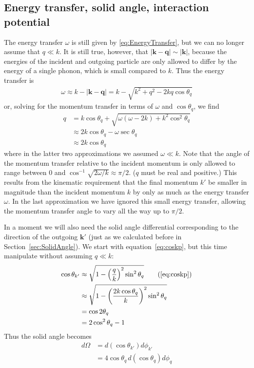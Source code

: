 \documentclass{article}
\begin{document}
\subsection{Energy transfer, solid angle, interaction potential}

The energy transfer $\omega$ is still given by \eqref{eq:EnergyTransfer}, but we can no longer assume that $q \ll k$. It is still true, however, that $|\textbf{k} - \textbf{q}| \sim |\textbf{k}|$, because the energies of the incident and outgoing particle are only allowed to differ by the energy of a single phonon, which is small compared to $k$. Thus the energy transfer is
\begin{align}
\omega \approx k - |\textbf{k} - \textbf{q}| = k - \sqrt{k^2 + q^2 - 2 kq \cos\theta_q}
\end{align}
or, solving for the momentum transfer in terms of $\omega$ and $\cos\theta_q$, we find
\begin{align}
q &= k \cos\theta_q + \sqrt{\omega(\omega - 2 k) + k^2 \cos^2 \theta_q} \label{eq:LargeMomentumTransfer}\\
  &\approx 2k \cos\theta_q - \omega \sec \theta_q \\
  &\approx 2k \cos\theta_q \label{eq:DistantBrilliounZone1PhononMomentumTransfer}
\end{align}
where in the latter two approximations we assumed $\omega\ll k$. Note that the angle of the momentum transfer relative to the incident momentum is only allowed to range between $0$ and $\cos^{-1}\sqrt{2 \omega / k} \approx \pi / 2$. ($q$ must be real and positive.) This results from the kinematic requirement that the final momentum $k'$ be smaller in magnitude than the incident momentum $k$ by only as much as the energy transfer $\omega$. In the last approximation we have ignored this small energy transfer, allowing the momentum transfer angle to vary all the way up to $\pi / 2$.

In a moment we will also need the solid angle differential corresponding to the direction of the outgoing $\textbf{k}'$ (just as we calculated before in Section~\ref{sec:SolidAngle}). We start with equation~\eqref{eq:coskp}, but this time manipulate without assuming $q\ll k$:
\begin{align}
\cos\theta_{k'} &\approx\sqrt{1 - \left( \frac{q}{k} \right)^2 \sin^2 \theta_q} \tag{\ref{eq:coskp}}\\
  &\approx \sqrt{1 - \left( \frac{2 k \cos\theta_q}{k} \right)^2 \sin^2 \theta_q} \\
  &= \cos 2 \theta_q \\
  &= 2 \cos^2 \theta_q - 1
\end{align}
Thus the solid angle becomes
\begin{align}
d \Omega &= d(\cos\theta_{k'})d \phi_{k'} \\
   &= 4\cos\theta_q\, d(\cos\theta_q)d \phi_q
\end{align}
\end{document}
